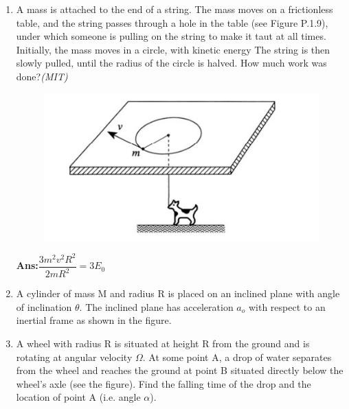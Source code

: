 \begin{enumerate}
\item A mass is attached to the end of a string. The mass moves on a frictionless table, and the string passes through a hole in the table (see Figure
P.1.9), under which someone is pulling on the string to make it taut at all
times. Initially, the mass moves in a circle, with kinetic energy The
string is then slowly pulled, until the radius of the circle is halved. How much work was done?\hfill \textsl{(MIT)}
\begin{figure}[htp]
    \centering
    \includegraphics{figures/kinem/kinem3.PNG}
    \label{fig:my_label}
\end{figure}
\textbf{Ans:}$\dfrac{3m^2v^2R^2}{2mR^2} = 3E_0$
\item A cylinder of mass M and radius R is placed on an inclined plane with angle of inclination $\theta$. The 
inclined plane has acceleration $a_o$ with respect to an inertial frame as shown in the figure.

\item A wheel with radius R is situated at height R from
the ground and is rotating at angular velocity $\Omega$. At some point A, a drop of water separates from the wheel and reaches the ground at point B situated directly below the wheel’s axle (see the figure). Find the falling time of the drop and the location of point A (i.e. angle $\alpha$).

\end{enumerate}



